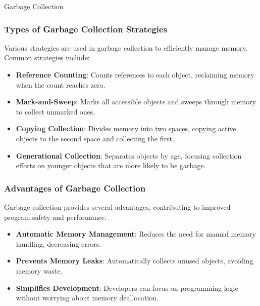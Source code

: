\begin{notes}{Garbage Collection}
\begin{highlight}
    \end{highlight}
    
    \subsubsection*{Types of Garbage Collection Strategies}
    
    Various strategies are used in garbage collection to efficiently manage memory. Common strategies include:
    
    \begin{highlight}
    
        \begin{itemize}
            \item \textbf{Reference Counting}: Counts references to each object, reclaiming memory when the count reaches zero.
            \item \textbf{Mark-and-Sweep}: Marks all accessible objects and sweeps through memory to collect unmarked ones.
            \item \textbf{Copying Collection}: Divides memory into two spaces, copying active objects to the second space and collecting the first.
            \item \textbf{Generational Collection}: Separates objects by age, focusing collection efforts on younger objects that are more likely to be garbage.
        \end{itemize}
    
    \end{highlight}
    
    \subsubsection*{Advantages of Garbage Collection}
    
    Garbage collection provides several advantages, contributing to improved program safety and performance.
    
    \begin{highlight}
    
        \begin{itemize}
            \item \textbf{Automatic Memory Management}: Reduces the need for manual memory handling, decreasing errors.
            \item \textbf{Prevents Memory Leaks}: Automatically collects unused objects, avoiding memory waste.
            \item \textbf{Simplifies Development}: Developers can focus on programming logic without worrying about memory deallocation.
        \end{itemize}
    

\end{highlight}
\end{notes}

